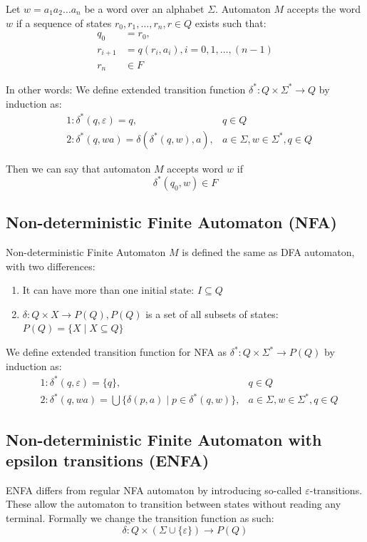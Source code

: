 \documentclass{ctuthesis}
\begin{document}
Let $w=a_1a_2\ldots a_n$ be a word over an alphabet $\Sigma$. Automaton $M$ accepts the word $w$ if a sequence of states $r_0, r_1, \ldots, r_n, r \in Q$ exists such that:
\begin{align*}
	q_0 &= r_0, \\
	r_{i+1} &= q(r_i, a_i), i=0, 1, \ldots, (n-1) \\
	r_n &\in F
\end{align*}

In other words: We define extended transition function $\delta^* : Q \times \Sigma^* \rightarrow Q$ by induction as:
\begin{align*}
	&1: \delta^*(q, \varepsilon) = q, &q \in Q \\
	&2: \delta^*(q, wa) = \delta(\delta^*(q, w), a), &a \in \Sigma, w \in \Sigma^*, q \in Q
\end{align*}

Then we can say that automaton $M$ accepts word $w$ if
\begin{equation*}
	\delta^*(q_0, w) \in F
\end{equation*}

\subsection{Non-deterministic Finite Automaton (NFA)}
Non-deterministic Finite Automaton $M$ is defined the same as DFA automaton, with two differences:
\begin{enumerate}
	\item It can have more than one initial state: $I \subseteq Q$
	\item $\delta : Q \times X \rightarrow P(Q), P(Q)$ is a set of all subsets of states: $P(Q) = \{X \mid X \subseteq Q\}$
\end{enumerate}

We define extended transition function for NFA as $\delta^* : Q \times \Sigma^* \rightarrow P(Q)$ by induction as:
\begin{align*}
	&1: \delta^*(q, \varepsilon) = \{q\}, &q \in Q \\
	&2: \delta^*(q, wa) = \bigcup\{\delta(p, a) \mid p \in \delta^*(q, w)\}, &a \in \Sigma, w \in \Sigma^*, q \in Q
\end{align*}

\subsection{Non-deterministic Finite Automaton with epsilon transitions (ENFA)}
ENFA differs from regular NFA automaton by introducing so-called $\varepsilon$-transitions. These allow the automaton to transition between states without reading any terminal. Formally we change the transition function as such:
\begin{equation*}
	\delta: Q \times (\Sigma \cup \{\varepsilon\}) \rightarrow P(Q)
\end{equation*}
\end{document}
